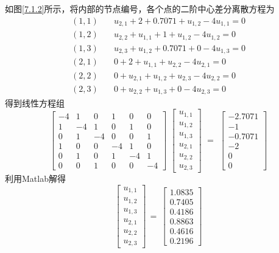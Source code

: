 \solve 如图\ref{7.1.2}所示，将内部的节点编号，各个点的二阶中心差分离散方程为
\begin{align*}
	(1,1) \quad & u_{2,1} + 2 + 0.7071 + u_{1,2} -4u_{1,1}= 0\\
	(1,2) \quad & u_{2,2} + u_{1,1} + 1 + u_{1,2} -4u_{1,2}= 0\\
	(1,3) \quad & u_{2,3} + u_{1,2} + 0.7071 + 0 -4u_{1,3}= 0\\
	(2,1) \quad & 0 + 2 + u_{1,1} + u_{2,2} -4u_{2,1}= 0\\
	(2,2) \quad & 0 + u_{2,1} + u_{1,2} + u_{2,3} -4u_{2,2}= 0\\
	(2,3) \quad & 0 + u_{2,2} + u_{1,3} + 0 -4u_{2,3}= 0
\end{align*}
得到线性方程组
\begin{equation*}
	\begin{bmatrix}
		-4 & 1 & 0 & 1 & 0 & 0\\
		1& -4 & 1 &  0 & 1 & 0 \\
		0& 1 & -4&  0& 0 & 1\\
		1& 0 & 0 & -4 & 1 & 0\\
		0 & 1 & 0  & 1 & -4 & 1\\
		0& 0& 1 &0 & 0 &-4
	\end{bmatrix}
	\,\,
	\begin{bmatrix}
		u_{1,1}\\
		u_{1,2}\\
		u_{1,3}\\
		u_{2,1}\\
		u_{2,2}\\
		u_{2,3}
	\end{bmatrix}
	\,\,
	=
	\,\,
	\begin{bmatrix}
		-2.7071\\
		-1\\
		-0.7071\\
		-2\\
		0\\
		0
	\end{bmatrix}
\end{equation*}
利用Matlab解得
\begin{equation*}
	\begin{bmatrix}
		u_{1,1}\\
		u_{1,2}\\
		u_{1,3}\\
		u_{2,1}\\
		u_{2,2}\\
		u_{2,3}
	\end{bmatrix}
	\, = \,
	\begin{bmatrix}
		1.0835\\
		0.7405\\
		0.4186\\
		0.8863\\
		0.4616\\
		0.2196
	\end{bmatrix}
\end{equation*}
\vspace*{1em}

